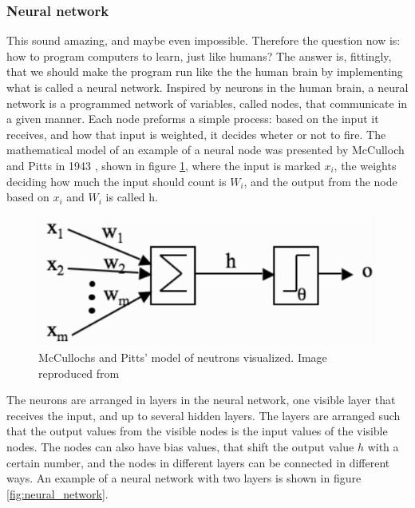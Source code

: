 \documentclass[norsk,a4paper,12pt]{article}
\begin{document}
\subsubsection{Neural network}
This sound amazing, and maybe even impossible. Therefore the question now is: how to program computers to learn, just like humans? The answer is, fittingly, that we should make the program run like the the human brain by implementing what is called a neural network. Inspired by neurons in the human brain, a neural network is a programmed network of variables, called nodes, that communicate in a given manner. Each node preforms a simple process: based on the input it receives, and how that input is weighted, it decides wheter or not to fire. The mathematical model of an example of a neural node was presented by McCulloch and Pitts in 1943 \cite{Marsland}, shown in figure \ref{fig:neuron}, where the input is marked $x_i$, the weights deciding how much the input should count is $W_i$, and the output from the node based on $x_i$ and $W_i$ is called h. 

 \begin{figure} [H]
 	\centering
 	\includegraphics[scale=0.6]{plots/neuron.png}
 	\caption{McCullochs and Pitts' model of neutrons visualized. Image reproduced from \cite{Marsland} }
 	\label{fig:neuron}
 \end{figure}

The neurons are arranged in layers in the neural network, one visible layer that receives the input, and up to several hidden layers. The layers are arranged such that the output values from the visible nodes is the input values of the visible nodes. The nodes can also have bias values, that shift the output value $h$ with a certain number, and the nodes in different layers can be connected in different ways.  An example of a neural network with two layers is shown in figure \ref{fig:neural_network}.
\end{document}
